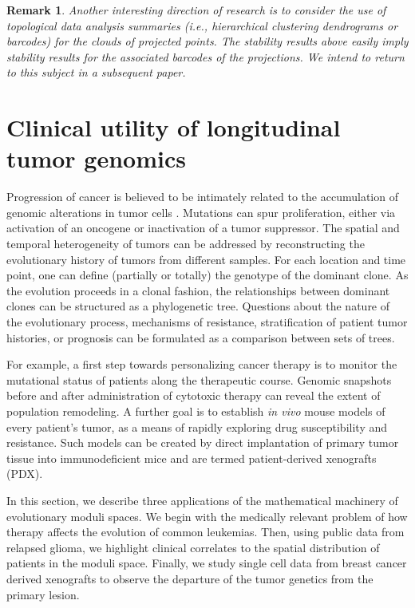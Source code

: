 \documentclass[a4paper,11pt]{article}
\newtheorem{remark}[theorem]{Remark}
\begin{document}
\begin{remark}
Another interesting direction of research is to consider the use of
topological data analysis summaries (i.e., hierarchical clustering
dendrograms or barcodes) for the clouds of projected points.  The
stability results above easily imply stability results for the
associated barcodes of the projections.  We intend to return to this
subject in a subsequent paper.
\end{remark}

\section{Clinical utility of longitudinal tumor genomics}\label{sec:cancer}

Progression of cancer is believed to be intimately related to the accumulation of genomic alterations in tumor cells \cite{nowell1976clonal}.
Mutations can spur proliferation, either via activation of an oncogene or inactivation of a tumor suppressor.
The spatial and temporal heterogeneity of tumors can be addressed by reconstructing the evolutionary history of tumors from different samples.
For each location and time point, one can define (partially or totally) the genotype of the dominant clone.
As the evolution proceeds in a clonal fashion, the relationships between dominant clones can be structured as a phylogenetic tree.
Questions about the nature of the evolutionary process, mechanisms of resistance, stratification of patient tumor histories, or prognosis can be formulated as a comparison between sets of trees.

For example, a first step towards personalizing cancer therapy is to monitor the mutational status of patients along the therapeutic course.
Genomic snapshots before and after administration of cytotoxic therapy
can reveal the extent of population remodeling.
A further goal is to establish \textit{in vivo} mouse models of every patient's tumor, as a means of rapidly exploring drug susceptibility and resistance.
Such models can be created by direct implantation of primary tumor
tissue into immunodeficient mice and are termed patient-derived
xenografts (PDX).  

In this section, we describe three applications of the mathematical
machinery of evolutionary moduli spaces.  We
begin with the medically relevant problem of how therapy affects the
evolution of common leukemias. Then, using public data from relapsed
glioma, we highlight clinical correlates to the spatial distribution
of patients in the moduli space.  Finally, we study single cell data from breast cancer derived xenografts to observe the departure of the tumor genetics from the primary lesion.  
\end{document}
